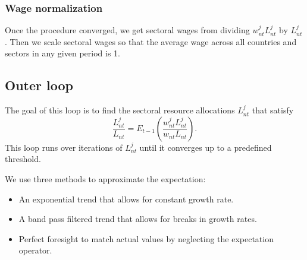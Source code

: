 \documentclass[11pt,oneside,a4paper]{article}
\begin{document}
\subsubsection{Wage normalization}
Once the procedure converged, we get sectoral wages from dividing $w_{nt}^j L_{nt}^j$ by $L_{nt}^j$. Then we scale sectoral wages so that the average wage across all countries and sectors in any given period is 1.

\newpage
\subsection{Outer loop}
The goal of this loop is to find the sectoral resource allocations $L_{nt}^j$ that satisfy
$$\frac{L_{nt}^{j}}{L_{nt}} = E_{t - 1} \left( \frac{w_{nt}^j L_{nt}^j}{w_{nt} L_{nt}}\right).$$
This loop runs over iterations of $L_{nt}^j$ until it converges up to a predefined threshold.

We use three methods to approximate the expectation:
\begin{itemize}
  \item An exponential trend that allows for constant growth rate.
  \item A band pass filtered trend that allows for breaks in growth rates.
  \item Perfect foresight to match actual values by neglecting the expectation operator.
\end{itemize}
\end{document}

